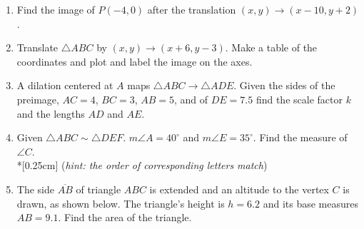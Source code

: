 \documentclass[12pt, twoside]{article}
\begin{document}
\begin{enumerate}
  \item Find the image of $P(-4,0)$ after the translation $(x,y) \rightarrow (x-10,y+2)$.

\newpage
  \item Translate $\triangle ABC$ by $(x,y) \rightarrow (x+6, y-3)$. Make a table of the coordinates and plot and label the image on the axes.
  \begin{flushright}
  \end{flushright}

  \item A dilation centered at $A$ maps $\triangle ABC \rightarrow \triangle ADE$. Given the sides of the preimage, $AC = 4$, $BC = 3$, $AB = 5$, and of $DE = 7.5$ find the scale factor $k$ and the lengths $AD$ and $AE$.
    \begin{flushright}
    \end{flushright} \vspace{1.5cm}

    \item Given $\triangle ABC \sim \triangle DEF$. $m\angle A = 40^\circ$ and $m\angle E = 35^\circ$. Find the measure of $\angle C$. \\*[0.25cm] (\emph{hint: the order of corresponding letters match})
    
\newpage

  \item The side $\overline{AB}$ of triangle $ABC$ is extended and an altitude to the vertex $C$ is drawn, as shown below. The triangle's height is $h=6.2$ and its base measures $AB=9.1$. Find the area of the triangle.
    \begin{flushright}
    \end{flushright}
    

\end{enumerate}
\end{document}
